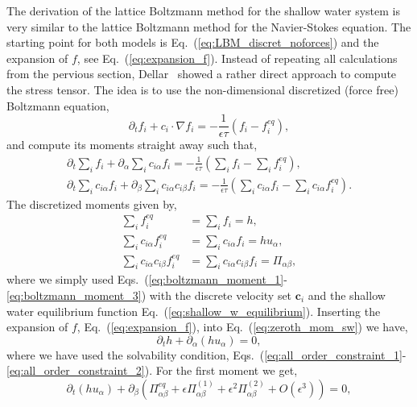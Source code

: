 The derivation of the lattice Boltzmann method for the shallow water system is very similar to the lattice Boltzmann method for the Navier-Stokes equation. 
The starting point for both models is Eq.~(\ref{eq:LBM_discret_noforces}) and the expansion of $f$, see Eq.~(\ref{eq:expansion_f}). 
Instead of repeating all calculations from the pervious section, Dellar~\cite{dellarNonhydrodynamicModesPriori2002} showed a rather direct approach to compute the stress tensor. 
The idea is to use the non-dimensional discretized (force free) Boltzmann equation,
\begin{equation}\label{eq:dellar_sw_lbe}
  \partial_t f_i + c_i\cdot\nabla f_i = -\frac{1}{\epsilon\tau}(f_i - f_i^{eq}),  
\end{equation}
and compute its moments straight away such that,
\begin{align}
    \partial_t \sum_i f_i + \partial_{\alpha}\sum_i c_{i\alpha} f_i = -\frac{1}{\epsilon\tau}\left(\sum_i f_i - \sum_i f_i^{eq}\right),\label{eq:zeroth_mom_sw}\\
    \partial_t \sum_i c_{i\alpha} f_i + \partial_{\beta}\sum_i c_{i\alpha} c_{i\beta} f_i = -\frac{1}{\epsilon\tau}\left(\sum_i c_{i\alpha} f_i - \sum_ic_{i\alpha} f_i^{eq}\right).\label{eq:first_mom_sw} 
\end{align}
The discretized moments given by, 
\begin{align}
    \sum_i f_i^{eq} &= \sum_i f_i = h,\label{eq:sw_lbm_mom_0}\\
    \sum_i c_{i\alpha}f_i^{eq} &= \sum_i c_{i\alpha}f_i = hu_{\alpha},\label{eq:sw_lbm_mom_1}\\
    \sum_i c_{i\alpha}c_{i\beta}f^{eq}_i &= \sum_i c_{i\alpha}c_{i\beta}f_i = \Pi_{\alpha\beta},\label{eq:sw_lbm_mom_2}
\end{align}
where we simply used Eqs.~(\ref{eq:boltzmann_moment_1}-\ref{eq:boltzmann_moment_3}) with the discrete velocity set $\mathbf{c}_i$ and the shallow water equilibrium function Eq.~(\ref{eq:shallow_w_equilibrium}).
Inserting the expansion of $f$, Eq.~(\ref{eq:expansion_f}), into Eq.~(\ref{eq:zeroth_mom_sw}) we have,
\begin{equation}
    \partial_t h + \partial_{\alpha}(h u_{\alpha}) = 0,
\end{equation}
where we have used the solvability condition, Eqs.~(\ref{eq:all_order_constraint_1}-\ref{eq:all_order_constraint_2}). 
For the first moment we get,
\begin{equation}
    \partial_t (hu_{\alpha}) + \partial_{\beta}\left(\Pi^{eq}_{\alpha\beta} + \epsilon\Pi^{(1)}_{\alpha\beta} + \epsilon^2\Pi^{(2)}_{\alpha\beta} + O(\epsilon^3)\right) = 0,
\end{equation}
